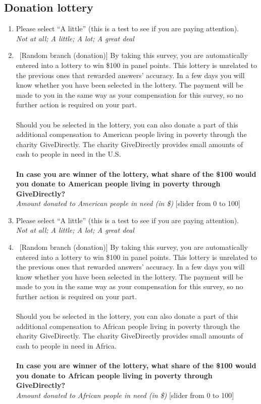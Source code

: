 \subsection*{Donation lottery}
\begin{enumerate}[resume] \item Please select ``A little'' (this is a test to see if you are paying attention).
\\ \textit{Not at all; A little; A lot; A great deal}
\item ~[Random branch (donation)] By taking this survey, you are automatically entered into a lottery to win \$100 in panel points. This lottery is unrelated to the previous ones that rewarded answers' accuracy. In a few days you will know whether you have been selected in the lottery. The payment will be made to you in the same way as your compensation for this survey, so no further action is required on your part.\\
\\
Should you be selected in the lottery, you can also donate a part of this additional compensation to American people living in poverty through the charity GiveDirectly. The charity GiveDirectly provides small amounts of cash to people in need in the U.S.\\
\\
\textbf{In case you are winner of the lottery, what share of the \$100 would you donate to American people living in poverty through GiveDirectly?}
\\ \textit{Amount donated to American people in need (in \$)} [slider from 0 to 100]
\item Please select ``A little'' (this is a test to see if you are paying attention).
\\ \textit{Not at all; A little; A lot; A great deal}
\item ~[Random branch (donation)] By taking this survey, you are automatically entered into a lottery to win \$100 in panel points. This lottery is unrelated to the previous ones that rewarded answers' accuracy. In a few days you will know whether you have been selected in the lottery. The payment will be made to you in the same way as your compensation for this survey, so no further action is required on your part.\\
\\
Should you be selected in the lottery, you can also donate a part of this additional compensation to African people living in poverty through the charity GiveDirectly. The charity GiveDirectly provides small amounts of cash to people in need in Africa.\\
\\
\textbf{In case you are winner of the lottery, what share of the \$100 would you donate to African people living in poverty through GiveDirectly?}
\\ \textit{Amount donated to African people in need (in \$)} [slider from 0 to 100]
\end{enumerate}

